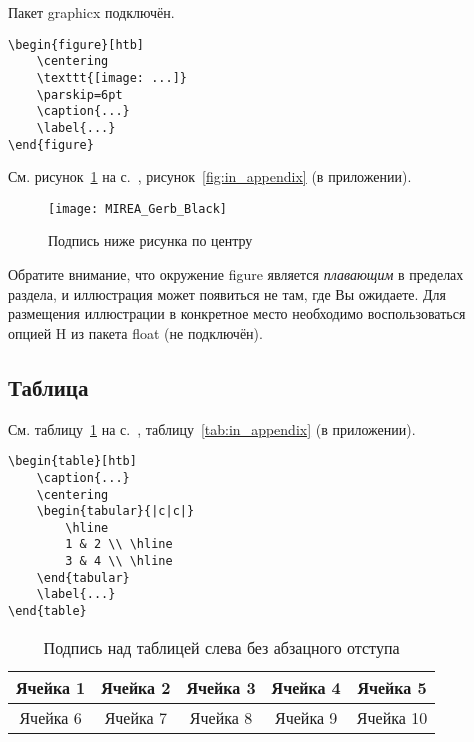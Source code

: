 \documentclass[14pt, a4paper, titlepage]{extarticle}
\begin{document}
Пакет graphicx подключён.

\begin{verbatim}
\begin{figure}[htb]
    \centering
    \texttt{[image: ...]}
    \parskip=6pt
    \caption{...}
    \label{...}
\end{figure}
\end{verbatim}

См. рисунок~\ref{fig:test_label} на с.~\pageref{fig:test_label}, рисунок~\ref{fig:in_appendix} (в приложении).

\begin{figure}[htb]
    \centering
    \texttt{[image: MIREA\_Gerb\_Black]}
    \parskip=6pt
    \caption{Подпись ниже рисунка по центру}
    \label{fig:test_label}
\end{figure}

Обратите внимание, что окружение figure является \emph{плавающим} в пределах раздела, и иллюстрация может появиться не там, где Вы ожидаете. Для размещения иллюстрации в конкретное место необходимо воспользоваться опцией H из пакета float (не подключён).

\subsection{Таблица}

См. таблицу~\ref{tab:test_label} на с.~\pageref{tab:test_label}, таблицу~\ref{tab:in_appendix} (в приложении).

\begin{verbatim}
\begin{table}[htb]
    \caption{...}
    \centering
    \begin{tabular}{|c|c|} 
        \hline
        1 & 2 \\ \hline
        3 & 4 \\ \hline
    \end{tabular}
    \label{...}
\end{table}
\end{verbatim}

\begin{table}[htb]
    \caption{Подпись над таблицей слева без абзацного отступа}
    \centering
    \begin{tabular}{ |c|c|c|c|c| } 
        \hline
        Ячейка 1 & Ячейка 2 & Ячейка 3 & Ячейка 4 & Ячейка 5 \\ \hline
        Ячейка 6 & Ячейка 7 & Ячейка 8 & Ячейка 9 & Ячейка 10 \\ \hline
    \end{tabular}
    \label{tab:test_label}
\end{table}
\end{document}

